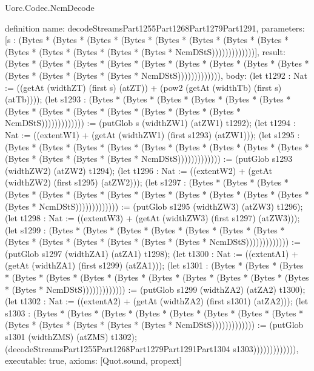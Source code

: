 \begin{lexlean}{Uorc.Codec.NcmDecode}
\begin{semanticmodule}
definition{
  name: decodeStreamsPart1255Part1268Part1279Part1291,
  parameters: [s : (Bytes * (Bytes * (Bytes * (Bytes * (Bytes * (Bytes * (Bytes * (Bytes * (Bytes * (Bytes * (Bytes * (Bytes * (Bytes * NcmDStS)))))))))))))],
  result: (Bytes * (Bytes * (Bytes * (Bytes * (Bytes * (Bytes * (Bytes * (Bytes * (Bytes * (Bytes * (Bytes * (Bytes * (Bytes * NcmDStS))))))))))))),
  body: (let t1292 : Nat := ((getAt (widthZT) (first s) (atZT)) + (pow2 (getAt (widthTb) (first s) (atTb)))); (let s1293 : (Bytes * (Bytes * (Bytes * (Bytes * (Bytes * (Bytes * (Bytes * (Bytes * (Bytes * (Bytes * (Bytes * (Bytes * (Bytes * NcmDStS))))))))))))) := (putGlob s (widthZW1) (atZW1) t1292); (let t1294 : Nat := ((extentW1) + (getAt (widthZW1) (first s1293) (atZW1))); (let s1295 : (Bytes * (Bytes * (Bytes * (Bytes * (Bytes * (Bytes * (Bytes * (Bytes * (Bytes * (Bytes * (Bytes * (Bytes * (Bytes * NcmDStS))))))))))))) := (putGlob s1293 (widthZW2) (atZW2) t1294); (let t1296 : Nat := ((extentW2) + (getAt (widthZW2) (first s1295) (atZW2))); (let s1297 : (Bytes * (Bytes * (Bytes * (Bytes * (Bytes * (Bytes * (Bytes * (Bytes * (Bytes * (Bytes * (Bytes * (Bytes * (Bytes * NcmDStS))))))))))))) := (putGlob s1295 (widthZW3) (atZW3) t1296); (let t1298 : Nat := ((extentW3) + (getAt (widthZW3) (first s1297) (atZW3))); (let s1299 : (Bytes * (Bytes * (Bytes * (Bytes * (Bytes * (Bytes * (Bytes * (Bytes * (Bytes * (Bytes * (Bytes * (Bytes * (Bytes * NcmDStS))))))))))))) := (putGlob s1297 (widthZA1) (atZA1) t1298); (let t1300 : Nat := ((extentA1) + (getAt (widthZA1) (first s1299) (atZA1))); (let s1301 : (Bytes * (Bytes * (Bytes * (Bytes * (Bytes * (Bytes * (Bytes * (Bytes * (Bytes * (Bytes * (Bytes * (Bytes * (Bytes * NcmDStS))))))))))))) := (putGlob s1299 (widthZA2) (atZA2) t1300); (let t1302 : Nat := ((extentA2) + (getAt (widthZA2) (first s1301) (atZA2))); (let s1303 : (Bytes * (Bytes * (Bytes * (Bytes * (Bytes * (Bytes * (Bytes * (Bytes * (Bytes * (Bytes * (Bytes * (Bytes * (Bytes * NcmDStS))))))))))))) := (putGlob s1301 (widthZMS) (atZMS) t1302); (decodeStreamsPart1255Part1268Part1279Part1291Part1304 s1303))))))))))))),
  executable: true,
  axioms: [Quot.sound, propext]
}


\end{semanticmodule}
\end{lexlean}
